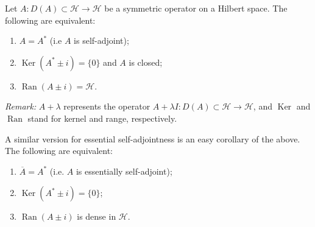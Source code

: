 \documentclass[12pt]{article}
\begin{document}
Let $A\colon D(A)\subset \mathscr{H}\to \mathscr{H}$ be a symmetric operator on a Hilbert space. The following are equivalent:
\begin{enumerate}
\item $A=A^*$ (i.e $A$ is self-adjoint);
\item $\operatorname{Ker}(A^* \pm i) = \{0\}$ and $A$ is closed;
\item $\operatorname{Ran}(A \pm i) = \mathscr{H}$.
\end{enumerate}

\emph{Remark:} $A+\lambda$ represents the operator $A+\lambda I\colon D(A)\subset \mathscr{H}\to \mathscr{H}$, and $\operatorname{Ker}$ and $\operatorname{Ran}$ stand for kernel and range, respectively.

A similar version for essential self-adjointness is an easy corollary of the above. The following are equivalent:

\begin{enumerate}
\item $\overline A=A^*$ (i.e. $A$ is essentially self-adjoint);
\item $\operatorname{Ker}(A^*\pm i) = \{0\}$;
\item $\operatorname{Ran}(A \pm i)$ is dense in $\mathscr{H}$.
\end{enumerate}
\end{document}
